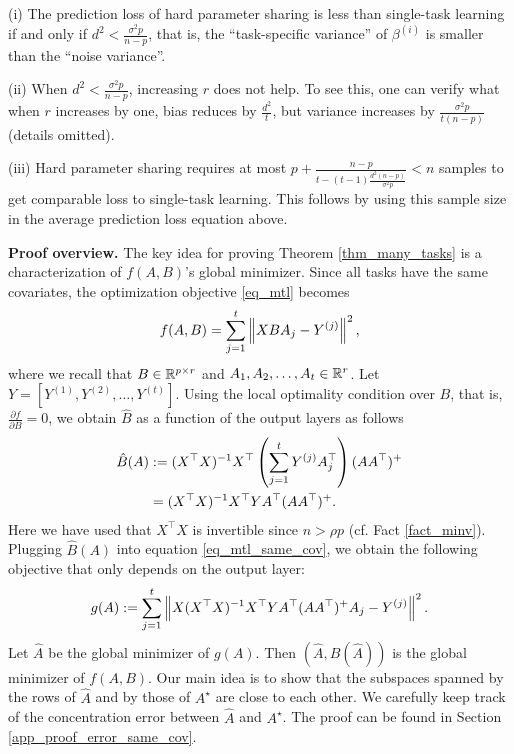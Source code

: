 (i) The prediction loss of hard parameter sharing is less than single-task learning if and only if ${d^2}{} < \frac{\sigma^2 p}{n - p}$, that is, the ``task-specific variance'' of $\beta^{(i)}$ is smaller than the ``noise variance''.

(ii) When ${d^2}{} < \frac{\sigma^2 p}{n - p}$, increasing $r$ does not help.
	To see this, one can verify what when $r$ increases by one, bias reduces by $\frac{d^2}{t}$, but variance increases by $\frac{\sigma^2 p}{t(n-p)}$ (details omitted).

(iii) Hard parameter sharing requires at most $p + \frac{n - p}{t - (t - 1)\frac{d^2 (n - p)}{\sigma^2 p}} < n$ samples to get comparable loss to single-task learning.
	This follows by using this sample size in the average prediction loss equation above.


\textbf{Proof overview.} The key idea for proving Theorem \ref{thm_many_tasks} is a characterization of $f(A, B)$'s global minimizer.
	Since all tasks have the same covariates, the optimization objective \eqref{eq_mtl} becomes
	\begin{align}
		f(A, B) = \sum_{j=1}^t \left\| X B A_j - Y^{(j)} \right\|^2, \label{eq_mtl_same_cov}
	\end{align}
	where we recall that $B \in \mathbb{R}^{p \times r}$ and $A_1, A_2, \dots, A_t \in \mathbb{R}^r$.
	Let $Y = [Y^{(1)}, Y^{(2)}, \dots, Y^{(t)}]$.
	Using the local optimality condition over $B$, that is, $\frac{\partial f}{\partial B} = 0$, we obtain $\hat{B}$ as a function of the output layers as follows
	\begin{align}
		\hat{B}(A) &:= (X^{\top}X)^{-1} X^{\top} \left({\sum_{j=1}^t Y^{(j)} A_j^{\top}}\right) (A  A^{\top})^{+} \nonumber \\
		&= (X^{\top} X)^{-1} X^{\top} Y A^{\top} (AA^{\top})^{+}. \label{eq_Bhat}
	\end{align}
	Here we have used that $X^{\top}X$ is invertible since $n > \rho p$ (cf. Fact \ref{fact_minv}).
	Plugging $\hat{B}(A)$ into equation \eqref{eq_mtl_same_cov}, we obtain the following objective that only depends on the output layer:
	\begin{align}
		g(A) := \sum_{j=1}^t \left\| X (X^{\top}X)^{-1}X^{\top} Y A^{\top} (AA^{\top})^{+} A_j - Y^{(j)} \right\|^2. \label{eq_mtl_output_layer}
	\end{align}
	Let $\hat{A}$ be the global minimizer of $g(A)$. Then  $(\hat{A}, \hat{B}(\hat A))$ is the global minimizer of $f(A, B)$. 
	Our main idea is to show that the subspaces spanned by the rows of $\hat{A}$ and by those of $A^{\star}$ are close to each other.
	We carefully keep track of the concentration error between $\hat{A}$ and $A^{\star}$.
	The proof can be found in Section \ref{app_proof_error_same_cov}.
